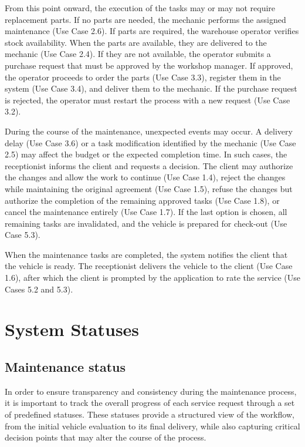 From this point onward, the execution of the tasks may or may not require replacement parts. If no parts are needed, the mechanic performs the assigned maintenance (Use Case 2.6). If parts are required, the warehouse operator verifies stock availability. When the parts are available, they are delivered to the mechanic (Use Case 2.4). If they are not available, the operator submits a purchase request that must be approved by the workshop manager. If approved, the operator proceeds to order the parts (Use Case 3.3), register them in the system (Use Case 3.4), and deliver them to the mechanic. If the purchase request is rejected, the operator must restart the process with a new request (Use Case 3.2).

During the course of the maintenance, unexpected events may occur. A delivery delay (Use Case 3.6) or a task modification identified by the mechanic (Use Case 2.5) may affect the budget or the expected completion time. In such cases, the receptionist informs the client and requests a decision. The client may authorize the changes and allow the work to continue (Use Case 1.4), reject the changes while maintaining the original agreement (Use Case 1.5), refuse the changes but authorize the completion of the remaining approved tasks (Use Case 1.8), or cancel the maintenance entirely (Use Case 1.7). If the last option is chosen, all remaining tasks are invalidated, and the vehicle is prepared for check-out (Use Case 5.3).

When the maintenance tasks are completed, the system notifies the client that the vehicle is ready. The receptionist delivers the vehicle to the client (Use Case 1.6), after which the client is prompted by the application to rate the service (Use Cases 5.2 and 5.3).


\section{System Statuses} 

\subsection{Maintenance status} 

In order to ensure transparency and consistency during the maintenance process, it is important to track the overall progress of each service request through a set of predefined statuses. These statuses provide a structured view of the workflow, from the initial vehicle evaluation to its final delivery, while also capturing critical decision points that may alter the course of the process.

